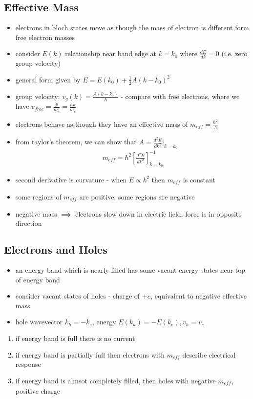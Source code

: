\documentclass[a4paper,11pt,normalem]{article}
\begin{document}
\subsection{Effective Mass}

\begin{itemize}
    \item electrons in bloch states move as though the mass of electron is different form free electron masses
    \item consider \(E(k)\) relationship near band edge at \(k = k_0\) where \(\frac{dE}{dk} = 0\) (i.e. zero group velocity)
    \item general form given by \(E = E(k_0) + \frac{1}{2}A(k - k_0)^2\)
    \item group velocity: \(v_g(k) = \frac{A(k-k_0)}{\hbar}\) - compare with free electrons, where we have \(v_{free} = \frac{p}{m_e} = \frac{\hbar k}{m_e}\)
    \item electrons behave as though they have an effective mass of \(m_{eff} = \frac{\hbar^2}{A_{}}\)
    \item from taylor's theorem, we can show that \(A = \frac{d^2E}{dk^2}\Big|_{k=k_0}\)
        \begin{align*}
            m_{eff} = \hbar^2\left[\frac{d^2E}{dk^2}\right]^{-1}_{k=k_0}
        \end{align*}
    \item second derivative is curvature - when \(E \propto k^2\) then \(m_{eff_{}}\) is constant
    \item some regions of \(m_{eff_{}}\) are positive, some regions are negative
    \item negative mass \(\implies\) electrons slow down in electric field, force is in opposite direction
\end{itemize}

\subsection{Electrons and Holes}

\begin{itemize}
    \item an energy band which is nearly filled has some vacant energy states near top of energy band
    \item consider vacant states of holes - charge of \(+e\), equivalent to negative effective mass
    \item hole wavevector \(k_h = -k_e\), energy \(E(k_h) = - E(k_e), v_h = v_e\)
\end{itemize}

\begin{enumerate}
    \item if energy band is full there is no current
    \item if energy band is partially full then electrons with $m_{eff}$ describe electrical response
    \item if energy band is almsot completely filled, then holes with negative \(m_{eff_{}}\), positive charge
\end{enumerate}
\end{document}
